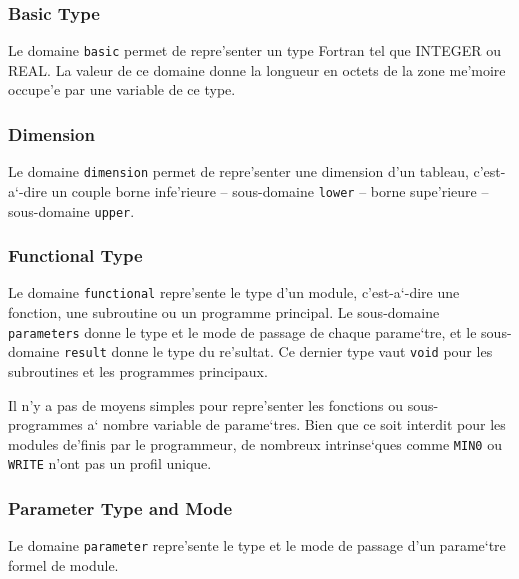 \subsubsection{Basic Type}
\label{subsubsection-basic}

{
Le domaine \verb/basic/ permet de repre'senter un type Fortran tel que
INTEGER ou REAL. La valeur de ce domaine donne la longueur en octets de
la zone me'moire occupe'e par une variable de ce type.
}

\subsubsection{Dimension}
\label{subsubsection-dimension}

{
Le domaine \verb/dimension/ permet de repre'senter une dimension d'un
tableau, c'est-a`-dire un couple borne infe'rieure -- sous-domaine
\verb/lower/ -- borne supe'rieure -- sous-domaine \verb/upper/.
}

\subsubsection{Functional Type}
\label{subsubsection-functional}

{ Le domaine \verb/functional/ repre'sente le type d'un module,
c'est-a`-dire une fonction, une subroutine ou un programme principal. Le
sous-domaine \verb/parameters/ donne le type et le mode de passage de
chaque parame`tre, et le sous-domaine \verb/result/ donne le type du
re'sultat. Ce dernier type vaut \verb/void/ pour les subroutines et les
programmes principaux.

Il n'y a pas de moyens simples pour repre'senter les fonctions ou
sous-programmes a` nombre variable de parame`tres. Bien que ce soit
interdit pour les modules de'finis par le programmeur, de nombreux
intrinse`ques comme \verb+MIN0+ ou \verb+WRITE+ n'ont pas un profil
unique.  }

\subsubsection{Parameter Type and Mode}
\label{subsubsection-parameter}

{
Le domaine \verb/parameter/ repre'sente le type et le mode de passage d'un
parame`tre formel de module. 
}

